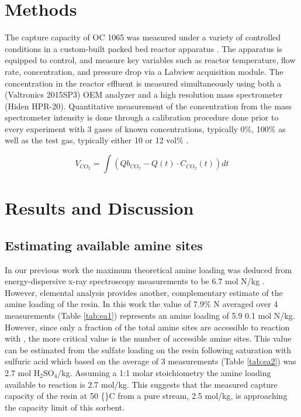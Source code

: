 \documentclass[journal=iecred,manuscript=article]{achemso}
\begin{document}
\section{Methods}
\label{sec-2}
The   capture capacity of OC 1065 was measured under a variety of controlled conditions in a custom-built packed bed reactor apparatus \cite{doi:10.1021/ie300452c}. The apparatus is equipped to control, and measure key variables such as reactor temperature, flow rate,   concentration, and pressure drop via a Labview acquisition module. The   concentration in the reactor effluent is measured simultaneously using both a (Valtronics 2015SP3) OEM   analyzer and a high resolution mass spectrometer (Hiden HPR-20). Quantitative measurement of the   concentration from the mass spectrometer intensity is done through a calibration procedure done prior to every experiment with 3 gases of known concentrations, typically 0\%, 100\%   as well as the test gas, typically either 10 or 12 vol\% . 


\begin{equation}
V_{CO_2} = \int (Qb_{CO_2} - Q(t) \cdot C_{CO_2}(t)) dt \label{eq:vco2}
\end{equation}

\section{Results and Discussion}
\label{sec-3}
\subsection{Estimating available amine sites}
\label{sec-3-1}

In our previous work the maximum theoretical amine loading was deduced from energy-dispersive x-ray spectroscopy measurements to be 6.7 mol N/kg \cite{doi:10.1021/ie300452c}. However, elemental analysis provides another, complementary estimate of the amine loading of the resin. In this work the value of 7.9\% N averaged over 4 measurements (Table \ref{tab:ea1}) represents an amine loading of 5.9 \textpm{} 0.1 mol N/kg. However, since only a fraction of the total amine sites are accessible to reaction with , the more critical value is the number of accessible amine sites. This value can be estimated from the sulfate loading on the resin following saturation with sulfuric acid which based on the average of 3 measurements (Table \ref{tab:ea2}) was 2.7 mol H$_{\text{2}}$SO$_{\text{4}}$/kg. Assuming a 1:1 molar stoichiometry the amine loading available to reaction is 2.7 mol/kg. This suggests that the measured  capture capacity of the resin at 50 \{\}C from a pure  stream, 2.5 mol/kg, is approaching the capacity limit of this sorbent.
\end{document}
